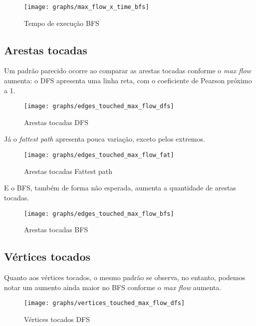 \documentclass[11pt]{article}
\begin{document}
\begin{figure}[H]
	\centering
	\caption{Tempo de execução BFS}
	\label{fig:max_flow_x_time_bfs}
	\texttt{[image: graphs/max\_flow\_x\_time\_bfs]}
\end{figure}

\subsection{Arestas tocadas}

Um padrão parecido ocorre ao comparar as arestas tocadas conforme o \textit{max flow} aumenta: o DFS apresenta uma linha reta, com o coeficiente de Pearson próximo a 1.

\begin{figure}[H]
	\centering
	\caption{Arestas tocadas DFS}
	\label{fig:edges_touched_max_flow_dfs}
	\texttt{[image: graphs/edges\_touched\_max\_flow\_dfs]}
\end{figure}

Já o \textit{fattest path} apresenta pouca variação, exceto pelos extremos.

\begin{figure}[H]
	\centering
	\caption{Arestas tocadas Fattest path}
	\label{fig:edges_touched_max_flow_fat}
	\texttt{[image: graphs/edges\_touched\_max\_flow\_fat]}
\end{figure}

E o BFS, também de forma não esperada, aumenta a quantidade de arestas tocadas.

\begin{figure}[H]
	\centering
	\caption{Arestas tocadas BFS}
	\label{fig:edges_touched_max_flow_bfs}
	\texttt{[image: graphs/edges\_touched\_max\_flow\_bfs]}
\end{figure}

\subsection{Vértices tocados}

Quanto aos vértices tocados, o mesmo padrão se observa, no entanto, podemos notar um aumento ainda maior no BFS conforme o \textit{max flow} aumenta.

\begin{figure}[H]
	\centering
	\caption{Vértices tocados DFS}
	\label{fig:vertices_touched_max_flow_dfs}
	\texttt{[image: graphs/vertices\_touched\_max\_flow\_dfs]}
\end{figure}
\end{document}
